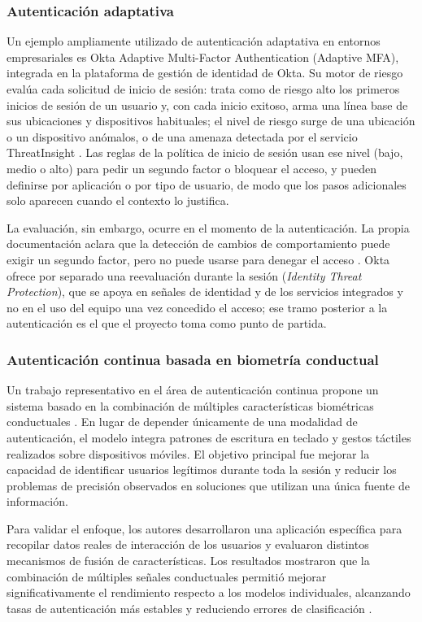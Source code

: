 \subsubsection{Autenticación adaptativa}\label{sec:ea-okta}
Un ejemplo ampliamente utilizado de autenticación adaptativa en entornos empresariales es Okta Adaptive Multi-Factor Authentication (Adaptive MFA), integrada en la plataforma de gestión de identidad de Okta. Su motor de riesgo evalúa cada solicitud de inicio de sesión: trata como de riesgo alto los primeros inicios de sesión de un usuario y, con cada inicio exitoso, arma una línea base de sus ubicaciones y dispositivos habituales; el nivel de riesgo surge de una ubicación o un dispositivo anómalos, o de una amenaza detectada por el servicio ThreatInsight \parencite{OktaRiskScoring}. Las reglas de la política de inicio de sesión usan ese nivel (bajo, medio o alto) para pedir un segundo factor o bloquear el acceso, y pueden definirse por aplicación o por tipo de usuario, de modo que los pasos adicionales solo aparecen cuando el contexto lo justifica.

La evaluación, sin embargo, ocurre en el momento de la autenticación. La propia documentación aclara que la detección de cambios de comportamiento puede exigir un segundo factor, pero no puede usarse para denegar el acceso \parencite{OktaRiskScoring}. Okta ofrece por separado una reevaluación durante la sesión (\emph{Identity Threat Protection}), que se apoya en señales de identidad y de los servicios integrados y no en el uso del equipo una vez concedido el acceso; ese tramo posterior a la autenticación es el que el proyecto toma como punto de partida.

\subsubsection{Autenticación continua basada en biometría conductual}
Un trabajo representativo en el área de autenticación continua propone un sistema basado en la combinación de múltiples características biométricas conductuales \parencite{Stylios2023}. En lugar de depender únicamente de una modalidad de autenticación, el modelo integra patrones de escritura en teclado y gestos táctiles realizados sobre dispositivos móviles. El objetivo principal fue mejorar la capacidad de identificar usuarios legítimos durante toda la sesión y reducir los problemas de precisión observados en soluciones que utilizan una única fuente de información.

Para validar el enfoque, los autores desarrollaron una aplicación específica para recopilar datos reales de interacción de los usuarios y evaluaron distintos mecanismos de fusión de características. Los resultados mostraron que la combinación de múltiples señales conductuales permitió mejorar significativamente el rendimiento respecto a los modelos individuales, alcanzando tasas de autenticación más estables y reduciendo errores de clasificación \parencite{Stylios2023}.

